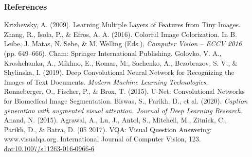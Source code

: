 \begin{vbframe}
\frametitle{References}
\footnotesize{
\begin{thebibliography}{99}
 Krizhevsky, A. (2009). Learning Multiple Layers of Features from Tiny Images.
 Zhang, R., Isola, P., \& Efros, A. A. (2016). Colorful Image Colorization. In B. Leibe, J. Matas, N. Sebe, \& M. Welling (Eds.), \textit{Computer Vision -- ECCV 2016} (pp. 649–666). Cham: Springer International Publishing.
 Golovko, V. A., Kroshchanka, A., Mikhno, E., Komar, M., Sachenko, A., Bezobrazov, S. V., \& Shylinska, I. (2019). Deep Convolutional Neural Network for Recognizing the Images of Text Documents. \textit{Modern Machine Learning Technologies}.
 Ronneberger, O., Fischer, P., \& Brox, T. (2015). U-Net: Convolutional Networks for Biomedical Image Segmentation.
Biswas, S., Parikh, D., et al. (2020). \textit{Caption generation with augmented visual attention. Journal of Deep Learning Research.}
 Anand, N. (2015). Agrawal, A., Lu, J., Antol, S., Mitchell, M., Zitnick, C., Parikh, D., \& Batra, D. (05 2017). VQA: Visual Question Answering: www.visualqa.org. International Journal of Computer Vision, 123. \url{doi:10.1007/s11263-016-0966-6}

\end{thebibliography}
}
\end{vbframe}




\endlecture

